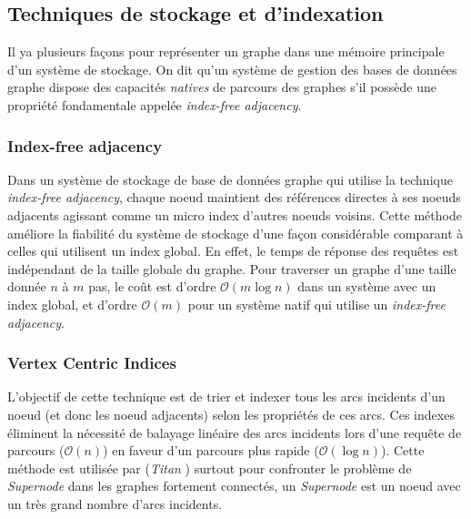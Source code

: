   \subsection{Techniques de stockage et d'indexation}
  \label{sec:graph-internals}
  Il ya plusieurs façons pour représenter un graphe dans une mémoire
  principale d'un système de stockage. On dit qu'un système de gestion
  des bases de données graphe dispose des capacités \emph{natives} de
  parcours des graphes s'il possède une propriété fondamentale
  appelée \emph{index-free adjacency}.

  
  \newpage

    \subsubsection{Index-free adjacency}
    \label{sec:index-free}
    Dans un système de stockage de base de données graphe qui utilise
    la technique \emph{index-free adjacency}, chaque noeud maintient
    des références directes à ses noeuds adjacents agissant comme un
    micro index d'autres noeuds voisins. Cette méthode améliore la
    fiabilité du système de stockage d'une façon considérable
    comparant à celles qui utilisent un index global. En effet, le temps
    de réponse des requêtes est indépendant de la taille globale du
    graphe. Pour traverser un graphe d'une taille donnée $n$ à $m$
    pas, le coût est d'ordre $\mathcal{O}(m\log{}n)$ dans un système
    avec un index global, et d'ordre $\mathcal{O}(m)$ pour un système
    natif qui utilise un \emph{index-free adjacency}.

    

    \subsubsection{Vertex Centric Indices}
    \label{sec:vertex}

    L'objectif de cette technique est de trier et indexer tous les arcs
    incidents d'un noeud (et donc les noeud adjacents) selon les
    propriétés de ces arcs. Ces indexes éliminent la nécessité de
    balayage linéaire des arcs incidents lors d'une requête de parcours
    ($\mathcal{O}(n)$) en faveur d'un parcours plus rapide
    ($\mathcal{O}(\log{}n)$). Cette méthode est utilisée par (\emph{Titan}
    \cite{vertexci}) surtout pour confronter le problème de
    \emph{Supernode} dans les graphes fortement connectés, un
    \emph{Supernode} est un noeud avec un très grand nombre d'arcs
    incidents.

